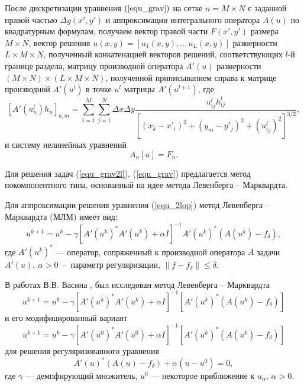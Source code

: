 После дискретизации уравнения $(\ref{equ_grav})$ на сетке $n=M\times N$ с заданной правой частью $\Delta g(x',y')$ и аппроксимации интегрального оператора $A(u)$ по квадратурным формулам, получаем вектор правой части $F(x',y')$ размера  $M\times N$, вектор решения $u(x,y)=[u_1(x,y),..,u_L(x,y)]$ размерности $L\times M\times N$, полученный конкатенацией векторов решений, соответствующих $l$-й границе раздела, матрицу производной оператора $A'(u)$ размерности $(M\times N)\times(L\times M\times N)$, полученной приписыванием справа к матрице производной $A'(u^l)$ в точке $u^l$ матрицы $A'(u^{l+1})$, где
\begin{equation}\label{op_grav_disc_form_mult}
[A'(u_n^l)h_n]_{k,m}=\sum\limits_{i=1}^{M}\sum\limits_{j=1}^{N}
\Delta x\Delta y\frac{u^l_{ij}h^l_{ij}}{[(x_k-x'_i)^2+(y_m-y'_j)^2+(u^l_{ij})^2]^{3/2}},
\end{equation} и систему нелинейных уравнений  
\begin{equation}\label{snl_equ}
A_n[u]=F_n.
\end{equation}

Для решения задач (\ref{equ_grav2l}), (\ref{equ_grav}) предлагается метод покомпонентного типа, основанный на идее метода Левенберга -- Марквардта. 

Для аппроксимации решения уравнения (\ref{equ_2lop}) метод Левенберга -- Марквардта (МЛМ) имеет вид:
\begin{equation}
u^{k+1}=u^k-\gamma[A'(u^k)^*A'(u^k)+\alpha I]^{-1} A'(u^k)^*(A(u^k)-f_\delta),
\end{equation}
где $A'(u^k)^*$ --- оператор, сопряженный к производной оператора $A$ задачи $A'(u)$, $\alpha>0$~--~параметр регуляризации, $\|f-f_\delta\|\le \delta.$
 
В работах В.В. Васина \cite{Vasin_2012}, \cite{VasPer_2011} был исследован метод Левенберга -- Марквардта
\begin{equation}\label{LM_Vasin}
u^{k+1}=u^k-\gamma[A'(u^k)^*A'(u^k)+\alpha I]^{-1} [A'(u^k)^*(A(u^k)-f_\delta)]
\end{equation} и его модифицированный вариант
\begin{equation}\label{LM_modif_Vasin}
u^{k+1}=u^k-\gamma[A'(u^0)^*A'(u^0)+\alpha I]^{-1} [A'(u^k)^*(A(u^k)-f_\delta)]
\end{equation} для решения регуляризованного уравнения
$$A'(u)^*(A(u)-f_\delta)+	\alpha (u-u^0)=0,$$
где $\gamma$ --- демпфирующий множитель, $u^0$ --- некоторое приближение к $u_\alpha$, $\alpha>0$. 

